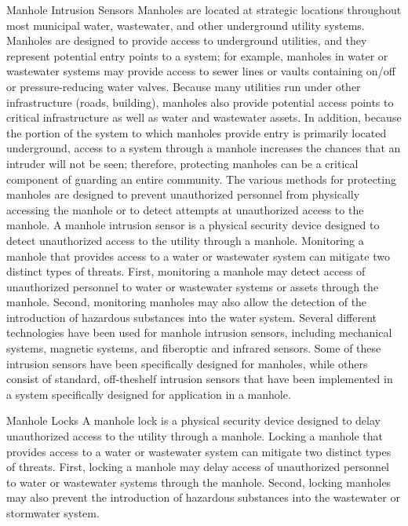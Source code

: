 \documentclass{article}
\begin{document}
Manhole Intrusion Sensors Manholes are located at strategic locations
throughout most municipal water, wastewater, and other underground
utility systems. Manholes are designed to provide access to underground
utilities, and they represent potential entry points to a system; for
example, manholes in water or wastewater systems may provide access to
sewer lines or vaults containing on/off or pressure-reducing water
valves. Because many utilities run under other infrastructure (roads,
building), manholes also provide potential access points to critical
infrastructure as well as water and wastewater assets. In addition,
because the portion of the system to which manholes provide entry is
primarily located underground, access to a system through a manhole
increases the chances that an intruder will not be seen; therefore,
protecting manholes can be a critical component of guarding an entire
community. The various methods for protecting manholes are designed to
prevent unauthorized personnel from physically accessing the manhole or
to detect attempts at unauthorized access to the manhole. A manhole
intrusion sensor is a physical security device designed to detect
unauthorized access to the utility through a manhole. Monitoring a
manhole that provides access to a water or wastewater system can
mitigate two distinct types of threats. First, monitoring a manhole may
detect access of unauthorized personnel to water or wastewater systems
or assets through the manhole. Second, monitoring manholes may also
allow the detection of the introduction of hazardous substances into the
water system. Several different technologies have been used for manhole
intrusion sensors, including mechanical systems, magnetic systems, and
fiberoptic and infrared sensors. Some of these intrusion sensors have
been specifically designed for manholes, while others consist of
standard, off-theshelf intrusion sensors that have been implemented in a
system specifically designed for application in a manhole.

Manhole Locks A manhole lock is a physical security device designed to
delay unauthorized access to the utility through a manhole. Locking a
manhole that provides access to a water or wastewater system can
mitigate two distinct types of threats. First, locking a manhole may
delay access of unauthorized personnel to water or wastewater systems
through the manhole. Second, locking manholes may also prevent the
introduction of hazardous substances into the wastewater or stormwater
system.
\end{document}
